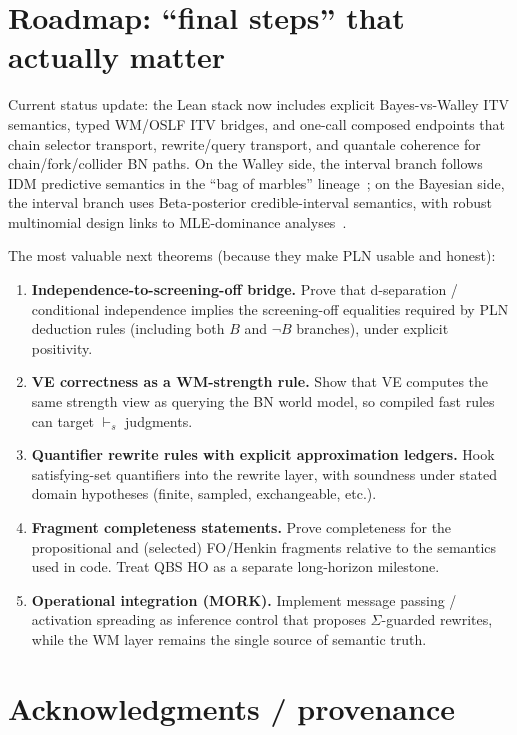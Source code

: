 \documentclass[11pt]{article}
\begin{document}
\section{Roadmap: ``final steps'' that actually matter}

Current status update: the Lean stack now includes explicit Bayes-vs-Walley ITV semantics,
typed WM/OSLF ITV bridges, and one-call composed endpoints that chain selector transport,
rewrite/query transport, and quantale coherence for chain/fork/collider BN paths.
On the Walley side, the interval branch follows IDM predictive semantics in the
``bag of marbles'' lineage~\cite{Walley1996BagOfMarbles}; on the Bayesian side,
the interval branch uses Beta-posterior credible-interval semantics, with robust
multinomial design links to MLE-dominance analyses~\cite{BenavoliDeCampos2009MLEDominance}.

The most valuable next theorems (because they make PLN usable and honest):

\begin{enumerate}[leftmargin=2em]
\item \textbf{Independence-to-screening-off bridge.}
Prove that d-separation / conditional independence implies the screening-off equalities required by
PLN deduction rules (including both $B$ and $\neg B$ branches), under explicit positivity.
\item \textbf{VE correctness as a WM-strength rule.}
Show that VE computes the same strength view as querying the BN world model,
so compiled fast rules can target $\vdash_s$ judgments.
\item \textbf{Quantifier rewrite rules with explicit approximation ledgers.}
Hook satisfying-set quantifiers into the rewrite layer, with soundness under stated domain hypotheses
(finite, sampled, exchangeable, etc.).
\item \textbf{Fragment completeness statements.}
Prove completeness for the propositional and (selected) FO/Henkin fragments relative to the semantics
used in code. Treat QBS HO as a separate long-horizon milestone.
\item \textbf{Operational integration (MORK).}
Implement message passing / activation spreading as inference control that proposes $\Sigma$-guarded rewrites,
while the WM layer remains the single source of semantic truth.
\end{enumerate}

\section*{Acknowledgments / provenance}
\end{document}
